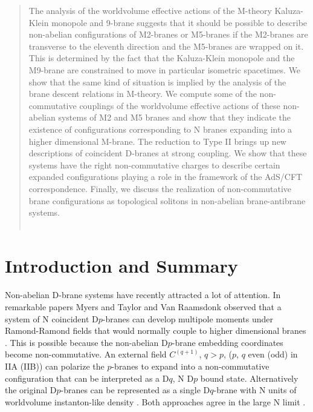 \documentclass[12pt,a4paper]{article}
\begin{document}
\begin{quotation}

\small

The analysis of the worldvolume effective actions of the M-theory
Kaluza-Klein monopole and 9-brane suggests that
it should be possible to describe non-abelian configurations of M2-branes
or M5-branes if the M2-branes are transverse to the
eleventh direction and the M5-branes are wrapped 
on it. This is determined by the fact that the Kaluza-Klein
monopole and the M9-brane are constrained to move in particular isometric
spacetimes. We show that the
same kind of situation is implied by the analysis of the brane
descent relations in M-theory.
We compute some of the non-commutative couplings of the
worldvolume effective actions of these non-abelian systems 
of M2 and M5 branes and show that they
indicate the existence of configurations corresponding to N branes expanding
into a higher dimensional M-brane. The reduction to Type II brings up
new descriptions of coincident D-branes at strong coupling.
We show that these systems have the right non-commutative charges
to describe certain expanded configurations playing a role in the
framework of the AdS/CFT correspondence. Finally, we discuss the
realization of non-commutative brane configurations as topological
solitons in non-abelian brane-antibrane systems.\\
\\


\end{quotation}




\newpage







\section{Introduction and Summary}


Non-abelian D-brane systems have recently attracted a lot of attention. 
In remarkable papers Myers and Taylor and Van Raamsdonk
observed that a system of N coincident D$p$-branes can develop 
multipole moments under 
Ramond-Ramond fields that would normally couple to higher dimensional branes
\cite{Myers} \cite{TvR}.
This is possible because the non-abelian D$p$-brane embedding 
coordinates become non-commutative. An external field $C^{(q+1)}$, $q>p$,
($p$, $q$ even (odd) in IIA (IIB))
can polarize the $p$-branes to expand into a non-commutative 
configuration that can be interpreted as a D$q$, N D$p$ bound state.
Alternatively the original D$p$-branes can be represented as a 
single D$q$-brane with N units of 
worldvolume instanton-like density \cite{Douglas}.
Both approaches agree in the large N limit \cite{Myers,CMT}.
\end{document}
